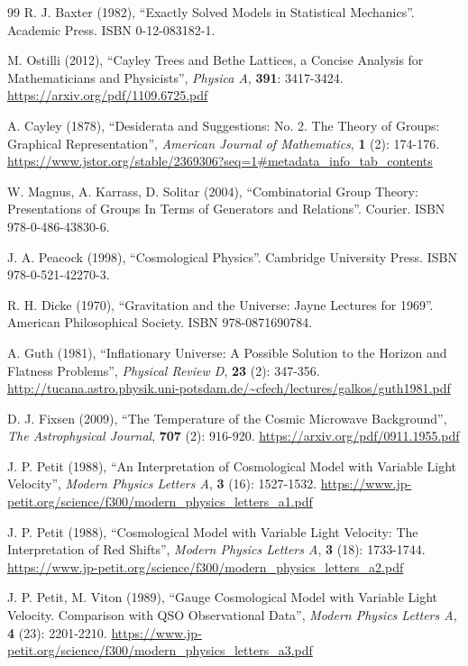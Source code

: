\documentclass{article}
\begin{document}
\begin{thebibliography}{99}
R. J. Baxter (1982), ``Exactly Solved Models in Statistical Mechanics''. Academic Press. ISBN 0-12-083182-1.

M. Ostilli (2012), ``Cayley Trees and Bethe Lattices, a Concise Analysis for Mathematicians and Physicists'', \textit{Physica A}, \textbf{391}: 3417-3424. \url{https://arxiv.org/pdf/1109.6725.pdf}

A. Cayley (1878), ``Desiderata and Suggestions: No. 2. The Theory of Groups: Graphical Representation'', \textit{American Journal of Mathematics}, \textbf{1} (2): 174-176. \url{https://www.jstor.org/stable/2369306?seq=1#metadata_info_tab_contents}

W. Magnus, A. Karrass, D. Solitar (2004), ``Combinatorial Group Theory: Presentations of Groups In Terms of Generators and Relations''. Courier. ISBN 978-0-486-43830-6.

J. A. Peacock (1998), ``Cosmological Physics''. Cambridge University Press. ISBN 978-0-521-42270-3.

R. H. Dicke (1970), ``Gravitation and the Universe: Jayne Lectures for 1969''. American Philosophical Society. ISBN 978-0871690784.

A. Guth (1981), ``Inflationary Universe: A Possible Solution to the Horizon and Flatness Problems'', \textit{Physical Review D}, \textbf{23} (2): 347-356. \url{http://tucana.astro.physik.uni-potsdam.de/~cfech/lectures/galkos/guth1981.pdf}

D. J. Fixsen (2009), ``The Temperature of the Cosmic Microwave Background'', \textit{The Astrophysical Journal}, \textbf{707} (2): 916-920. \url{https://arxiv.org/pdf/0911.1955.pdf}

J. P. Petit (1988), ``An Interpretation of Cosmological Model with Variable Light Velocity'', \textit{Modern Physics Letters A}, \textbf{3} (16): 1527-1532. \url{https://www.jp-petit.org/science/f300/modern_physics_letters_a1.pdf}

J. P. Petit (1988), ``Cosmological Model with Variable Light Velocity: The Interpretation of Red Shifts'', \textit{Modern Physics Letters A}, \textbf{3} (18): 1733-1744. \url{https://www.jp-petit.org/science/f300/modern_physics_letters_a2.pdf}

J. P. Petit, M. Viton (1989), ``Gauge Cosmological Model with Variable Light Velocity. Comparison with QSO Observational Data'', \textit{Modern Physics Letters A}, \textbf{4} (23): 2201-2210. \url{https://www.jp-petit.org/science/f300/modern_physics_letters_a3.pdf}


\end{thebibliography}
\end{document}
